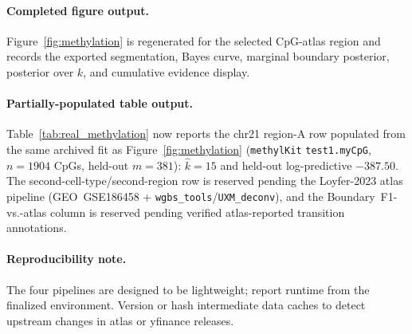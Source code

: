 \paragraph{Completed figure output.}
Figure~\ref{fig:methylation} is regenerated for the selected CpG-atlas region and records the exported segmentation, Bayes curve, marginal boundary posterior, posterior over $k$, and cumulative evidence display.

\paragraph{Partially-populated table output.}
Table~\ref{tab:real_methylation} now reports the chr21 region-A row populated from the same archived fit as Figure~\ref{fig:methylation} (\texttt{methylKit} \texttt{test1.myCpG}, $n=1904$ CpGs, held-out $m=381$): $\widehat k=15$ and held-out log-predictive $-387.50$. The second-cell-type/second-region row is reserved pending the Loyfer-2023 atlas pipeline (GEO~GSE186458 + \texttt{wgbs\_tools}/\texttt{UXM\_deconv}), and the Boundary~F1-vs.-atlas column is reserved pending verified atlas-reported transition annotations.

\paragraph{Reproducibility note.}
The four pipelines are designed to be lightweight; report runtime from the finalized environment. Version or hash intermediate data caches to detect upstream changes in
atlas or yfinance releases.

